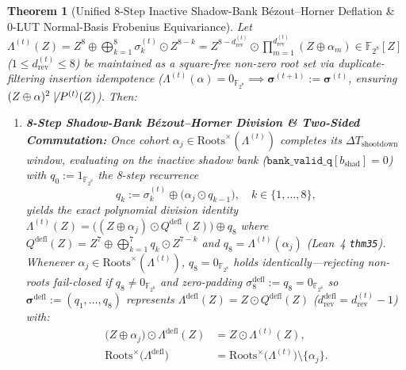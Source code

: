 \documentclass[11pt,letterpaper]{article}
\theoremstyle{spectralthm}
\newtheorem{theorem}{Theorem}[section]
\begin{document}
\begin{theorem}[Unified 8-Step Inactive Shadow-Bank B\'{e}zout--Horner Deflation \& 0-LUT Normal-Basis Frobenius Equivariance]
\label{thm:bezout_galois}
\label{thm:vieta_deflation_galois}
Let $\Lambda^{(t)}(Z) \allowbreak= Z^8 \allowbreak\oplus \bigoplus_{k=1}^8 \sigma_k^{(t)} \odot Z^{8-k} \allowbreak= Z^{8 - d_{\mathrm{rev}}^{(t)}} \odot \prod_{m=1}^{d_{\mathrm{rev}}^{(t)}}(Z \oplus \alpha_m) \in \mathbb{F}_{2^8}[Z]$ ($1 \le d_{\mathrm{rev}}^{(t)} \le 8$) be maintained as a square-free non-zero root set via duplicate-filtering insertion idempotence ($\Lambda^{(t)}(\alpha) = 0_{\mathbb{F}_{2^8}} \allowbreak\implies \boldsymbol{\sigma}^{(t+1)} := \boldsymbol{\sigma}^{(t)}$, ensuring $(Z \oplus \alpha)^2 \not\mid P^{(t)}(Z)$). Then:
\begin{enumerate}
  \item[(i)] \textbf{8-Step Shadow-Bank B\'{e}zout--Horner Division \& Two-Sided Commutation:} Once cohort $\alpha_j \in \mathrm{Roots}^\times(\Lambda^{(t)})$ completes its $\Delta T_{\mathrm{shootdown}}$ window, evaluating on the inactive shadow bank ($\texttt{bank\_valid\_q}[b_{\mathrm{shad}}] \allowbreak= 0$) with $q_0 := 1_{\mathbb{F}_{2^8}}$ the 8-step recurrence
  \begin{equation}
  \label{eq:bezout_horner}
  q_k := \sigma_k^{(t)} \oplus \bigl(\alpha_j \odot q_{k-1}\bigr), \quad k \in \{1,\ldots,8\},
  \end{equation}
  yields the exact polynomial division identity $\Lambda^{(t)}(Z) = \bigl((Z \oplus \alpha_j) \odot Q^{\mathrm{defl}}(Z)\bigr) \oplus q_8$ where $Q^{\mathrm{defl}}(Z) = Z^7 \oplus \bigoplus_{k=1}^7 q_k \odot Z^{7-k}$ and $q_8 = \Lambda^{(t)}(\alpha_j)$ (Lean~4 \texttt{thm35}). Whenever $\alpha_j \in \mathrm{Roots}^\times(\Lambda^{(t)})$, $q_8 = 0_{\mathbb{F}_{2^8}}$ holds identically---rejecting non-roots fail-closed if $q_8 \neq 0_{\mathbb{F}_{2^8}}$ and zero-padding $\sigma_8^{\mathrm{defl}} := q_8 = 0_{\mathbb{F}_{2^8}}$ so $\boldsymbol{\sigma}^{\mathrm{defl}} := (q_1,\ldots,q_8)$ represents $\Lambda^{\mathrm{defl}}(Z) = Z \odot Q^{\mathrm{defl}}(Z)$ ($d_{\mathrm{rev}}^{\mathrm{defl}} = d_{\mathrm{rev}}^{(t)} - 1$) with:
  \begin{equation}
  \label{eq:bezout_exact}
  \begin{aligned}
  \bigl(Z \oplus \alpha_j\bigr) \odot \Lambda^{\mathrm{defl}}(Z) &= Z \odot \Lambda^{(t)}(Z),\\
  \mathrm{Roots}^\times\bigl(\Lambda^{\mathrm{defl}}\bigr) &= \mathrm{Roots}^\times\bigl(\Lambda^{(t)}\bigr) \setminus \{\alpha_j\}.

\end{aligned}
\end{equation}
\end{enumerate}
\end{theorem}
\end{document}
